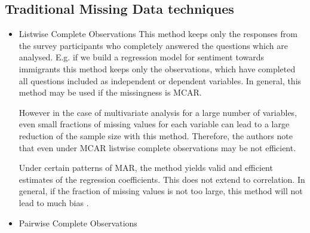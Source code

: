 \subsection{Traditional Missing Data techniques} 

\begin{itemize}
\item Listwise Complete Observations
This method keeps only the responses from the survey participants who completely answered the questions which are analysed. E.g. if we build a regression model for sentiment towards immigrants this method keeps only the observations, which have completed all questions included as independent or dependent variables.
In general, this method may be used if the missingness is MCAR. \par However in the case of multivariate analysis for a large number of variables, even small fractions of missing values for each variable can lead to a large reduction of the sample size with this method. Therefore, the authors note that even under MCAR listwise complete observations may be not efficient. \par Under certain patterns of MAR, the method yields valid and efficient estimates of the regression coefficients. This does not extend to correlation. In general, if the fraction of missing values is not too large, this method will not lead to much bias \cite{schafer2002missing}.  
\item Pairwise Complete Observations


\end{itemize}
